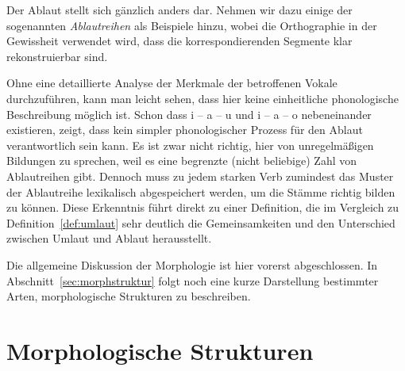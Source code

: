 
Der Ablaut stellt sich gänzlich anders dar.
Nehmen wir dazu einige der sogenannten \textit{Ablautreihen} als Beispiele hinzu, wobei die Orthographie in der Gewissheit verwendet wird, dass die korrespondierenden Segmente klar rekonstruierbar sind.

\begin{exe}
  \ex\label{ex:morph8827}
  \begin{xlist}
  \end{xlist}
\end{exe}

Ohne eine detaillierte Analyse der Merkmale der betroffenen Vokale durchzuführen, kann man leicht sehen, dass hier keine einheitliche phonologische Beschreibung möglich ist.
Schon dass i -- a -- u und i -- a -- o nebeneinander existieren, zeigt, dass kein simpler phonologischer Prozess für den Ablaut verantwortlich sein kann.
Es ist zwar nicht richtig, hier von unregelmäßigen Bildungen zu sprechen, weil es eine begrenzte (nicht beliebige) Zahl von Ablautreihen gibt.
Dennoch muss zu jedem starken Verb zumindest das Muster der Ablautreihe lexikalisch abgespeichert werden, um die Stämme richtig bilden zu können.
Diese Erkenntnis führt direkt zu einer Definition, die im Vergleich zu Definition~\ref{def:umlaut} sehr deutlich die Gemeinsamkeiten und den Unterschied zwischen Umlaut und Ablaut herausstellt.


Die allgemeine Diskussion der Morphologie ist hier vorerst abgeschlossen.
In Abschnitt~\ref{sec:morphstruktur} folgt noch eine kurze Darstellung bestimmter Arten, morphologische Strukturen zu beschreiben.

\section{Morphologische Strukturen}

